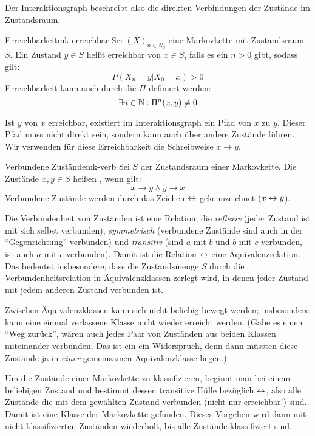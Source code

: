 Der Interaktionsgraph beschreibt also die direkten
Verbindungen der Zustände im Zustandsraum.

\begin{definition}{Erreichbarkeit}{mk-erreichbar}
Sei $(X)_{n\in N_0}$ eine Markovkette mit Zustandsraum $S$. Ein Zustand $y\in S$
heißt erreichbar von $x\in S$, falls es ein $n>0$ gibt, sodass gilt:
\[
P(X_n=y|X_0=x) > 0
\]
Erreichbarkeit kann auch durch die  $\Pi$
definiert werden:
\[
\exists n\in\mathbb{N}: \Pi^n(x,y) \ne 0
\]
\end{definition}

Ist $y$ von $x$ erreichbar, existiert im Interaktionsgraph ein Pfad von $x$ zu
$y$. Dieser Pfad muss nicht direkt sein, sondern kann auch über andere Zustände
führen. Wir verwenden für diese Erreichbarkeit die Schreibweise $x\to y$.

\begin{definition}{Verbundene Zustände}{mk-verb}
Sei $S$ der Zustandsraum einer Markovkette. Die Zustände $x,y\in S$ heißen
, wenn gilt:
\[
x\to y \land y \to x
\]
Verbundene Zustände werden durch das Zeichen $\leftrightarrow$ gekennzeichnet
($x \leftrightarrow y$).
\end{definition}

Die Verbundenheit von Zuständen ist eine Relation, die \emph{reflexiv} (jeder
Zustand ist mit sich selbst verbunden), \emph{symmetrisch} (verbundene
Zustände sind auch in der "`Gegenrichtung"' verbunden) und \emph{transitiv}
(sind $a$ mit $b$ und $b$ mit $c$ verbunden, ist auch $a$ mit $c$
verbunden). Damit ist die Relation $\leftrightarrow$ eine Äquivalenzrelation.
Das bedeutet insbesondere, dass die Zustandsmenge $S$ durch die Verbundenheitsrelation in
Äquivalenzklassen zerlegt wird, in denen jeder Zustand mit jedem anderen Zustand
verbunden ist.

Zwischen Äquivalenzklassen kann sich nicht beliebig bewegt werden; insbesondere
kann eine einmal verlassene Klasse nicht wieder erreicht werden. (Gäbe es einen
"`Weg zurück"', wären auch jedes Paar von Zuständen aus beiden Klassen
miteinander verbunden. Das ist ein ein Widerspruch, denn dann müssten diese
Zustände ja in \emph{einer} gemeinsamen Äquivalenzklasse liegen.)

Um die Zustände einer Markovkette zu klassifizieren, beginnt man bei einem
beliebigen Zustand und bestimmt dessen transitive Hülle bezüglich $\leftrightarrow$, also
alle Zustände die mit dem gewählten Zustand verbunden (nicht nur erreichbar!)
sind. Damit ist eine Klasse der Markovkette gefunden. Dieses Vorgehen
wird dann mit nicht klassifizierten Zuständen wiederholt, bis alle Zustände
klassifiziert sind.

